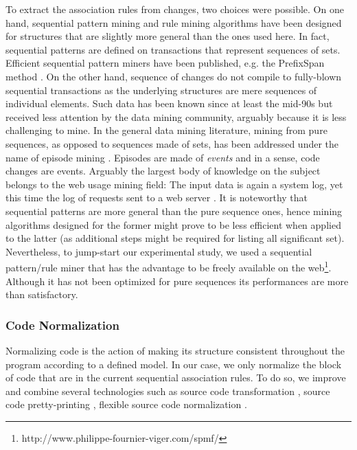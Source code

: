 To extract the association rules from changes,
two choices were possible. On one hand, sequential pattern mining and rule mining algorithms
have been designed for structures that are slightly more general than the ones used here.
In fact, sequential patterns are defined on transactions that represent sequences of sets.
Efficient sequential pattern miners have been published, e.g. the PrefixSpan method \cite{Pei2004}.
On the other hand, sequence of changes do not compile to fully-blown sequential transactions as the underlying structures are mere sequences of individual elements. Such data has been known since at least the mid-90s but received less attention by the data mining community, arguably because it is less challenging to mine.
In the general data mining literature, mining from pure sequences, as opposed to sequences made of sets, has been addressed under the name of episode mining \cite{HEIKKI1997}.
Episodes are made of \textit{events} and in a sense, code changes are events. Arguably the largest body of knowledge on the subject belongs to the web usage mining field: The input data is again a system log, yet this time the log of requests sent to a web server \cite{Pei2000}.
It is noteworthy that sequential patterns are more general than the pure sequence ones, hence mining algorithms designed for the former might prove to be less efficient when applied to the latter (as additional steps might be required for listing all significant set).
Nevertheless, to jump-start our experimental study, we used a sequential pattern/rule miner that has the advantage to be freely available on the web\footnote{http://www.philippe-fournier-viger.com/spmf/}.
Although it has not been optimized for pure sequences its performances are more than satisfactory.

\subsubsection{Code Normalization\label{sec:resemble-normalization}}

Normalizing code is the action of making its structure consistent throughout the program according to a defined model. In our case, we only normalize the block of code that are in the current sequential association rules. To do so, we improve and combine several technologies such as source code transformation \cite{Cordy2006,Cordy2006a}, source code pretty-printing \cite{Roy2008}, flexible source code normalization \cite{Cordy2011}.

